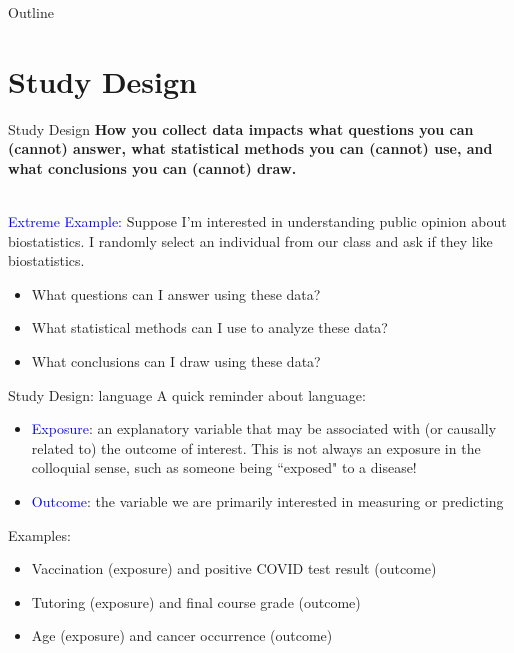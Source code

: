 \documentclass[10pt,t]{beamer}
\begin{document}
\begin{frame}{Outline}
\tableofcontents
\end{frame}


\section{Study Design}

\begin{frame}{Study Design}
\textbf{How you collect data impacts what questions you can (cannot) answer, what statistical methods you can (cannot) use, and what conclusions you can (cannot) draw.} \\~\

\textcolor{blue}{Extreme Example:} Suppose I'm interested in understanding public opinion about biostatistics. I randomly select an individual from our class and ask if they like biostatistics.

\begin{itemize}
	\item What questions can I answer using these data?
	\item What statistical methods can I use to analyze these data?
	\item What conclusions can I draw using these data?
\end{itemize}
\end{frame}

\begin{frame}{Study Design: language}
	A quick reminder about language:
	
	\vspace{0.3cm}
	
	\begin{itemize}
		\item \textcolor{blue}{Exposure}: an explanatory variable that may be associated with (or causally related to) the outcome of interest. This is not always an exposure in the colloquial sense, such as someone being ``exposed" to a disease!
		\item \textcolor{blue}{Outcome}: the variable we are primarily interested in measuring or predicting
	\end{itemize}
\vspace{0.3cm}
Examples: 
\vspace{0.3cm}
\begin{itemize}
	\item Vaccination (exposure) and positive COVID test result (outcome)
	\item Tutoring (exposure) and final course grade (outcome)
	\item Age (exposure) and cancer occurrence (outcome)
\end{itemize}
\end{frame}
\end{document}
